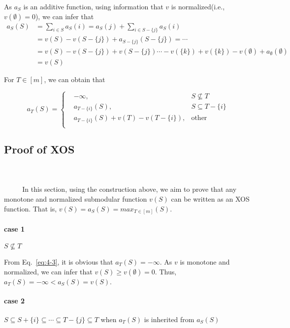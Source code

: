 \documentclass[oneside,solution]{seu-ml-assign}
\begin{document}
As \(a_{S}\) is an additive function, using information that \(v\) is
normalized(i.e., \(v(\emptyset)=0\)), we can infer that
\begin{equation}
    \begin{aligned}
a_{S}(S)&=\sum_{i\in S}a_{S}(i)=a_{S}(j)+\sum_{i\in S-\{j\}}a_{S}(i)\\
&=v(S)-v(S-\{j\})+a_{S-\{j\}}(S-\{j\})=\cdots \\
&=v(S)-v(S-\{j\})+v(S-\{j\})\cdots-v(\{k\})+v(\{k\})-v(\emptyset)+a_{\emptyset}(\emptyset)\\
&=v(S)
\end{aligned}
\end{equation}


For \(T\in[m]\), we can obtain that

\begin{equation}
    a_T(S)=\left\{
\begin{aligned}
&-\infty,  &S\not\subseteq T \\
&a_{T-\{i\}}(S), &S\subseteq T-\{i\}  \\
&a_{T-\{i\}}(S)+v(T)-v(T-\{i\})  ,&\text{other} \\
\end{aligned}
\right.
\label{eq:4-3}
\end{equation}
\subsection{Proof of XOS}
\\ \hspace*{\fill} \\
$\text{        }\quad\text{  }$
In this section, using the construction above, we aim to prove that any
monotone and normalized submodular function \(v(S)\) can be written as
an XOS function. That is, \(v(S)=a_{S}(S)=max_{T\in[m]}(S)\).
\paragraph{case 1} \(S\not\subseteq T\)

From Eq.~\eqref{eq:4-3}, it is obvious
that \(a_{T}(S)=-\infty\). As \(v\) is monotone and normalized, we can
infer that \(v(S)\geq v(\emptyset)=0\). Thus,
\(a_{T}(S)=-\infty<a_{S}(S)=v(S)\).

\paragraph{case 2}
\(S \subseteq S+\{i\}\subseteq \cdots\subseteq T-\{j\} \subseteq T\)
when \(a_{T}(S)\) is inherited from \(a_{S}(S)\)
\end{document}
